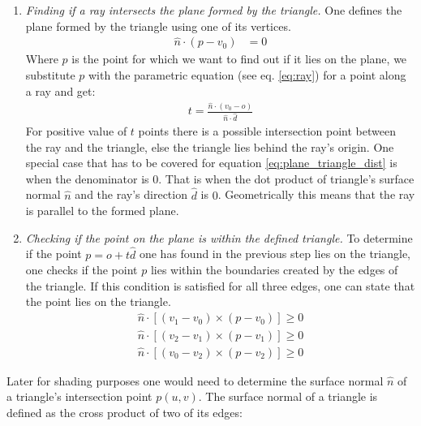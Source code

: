 \documentclass{article}
\begin{document}
\begin{enumerate}[1.]	
	\item \textit{Finding if a ray intersects the plane formed by the triangle.} One defines the plane formed by the triangle using one of its vertices.
	\begin{align}
	\hat{n} \cdot (p - v_{0}) &= 0
	\end{align}
	Where	$p$ is the point for which we want to find out if it lies on the plane, we substitute $p$ with the parametric equation (see eq. \ref{eq:ray}) for a point along a ray and get:
	\begin{align}
	t = \frac{\hat{n} \cdot (v_{0} - o)}{\hat{n} \cdot \hat{d}}
	\label{eq:plane_triangle_dist}
	\end{align}
	For positive value of $t$ points there is a possible intersection point between the ray and the triangle, else the triangle lies behind the ray's origin. One special case that has to be covered for equation \ref{eq:plane_triangle_dist} is when the denominator is $0$. That is when the dot product of triangle's surface  normal $\hat{n}$ and the ray's direction $\hat{d}$ is $0$. Geometrically this means that the ray is parallel to the formed plane.
	
	\item \textit{Checking if the point on the plane is within the defined triangle.} To determine if the point $p = o + t\hat{d}$ one has found in the previous step lies on the triangle, one checks if the point $p$ lies within the boundaries created by the edges of the triangle. If this condition is satisfied for all three edges, one can state that the point lies on the triangle.
	\begin{align}
	\hat{n} \cdot [(v_{1} - v_{0}) \times (p - v_{0})] \geq 0 \\
	\hat{n} \cdot [(v_{2} - v_{1}) \times (p - v_{1})] \geq 0 \\
	\hat{n} \cdot [(v_{0} - v_{2}) \times (p - v_{2})] \geq 0
	\end{align}
\end{enumerate}

\vspace*{\baselineskip}

Later for shading purposes one would need to determine the surface normal $\hat{n}$ of a triangle's intersection point $p(u, v)$. The surface normal of a triangle is defined as the cross product of two of its edges: 
\end{document}
